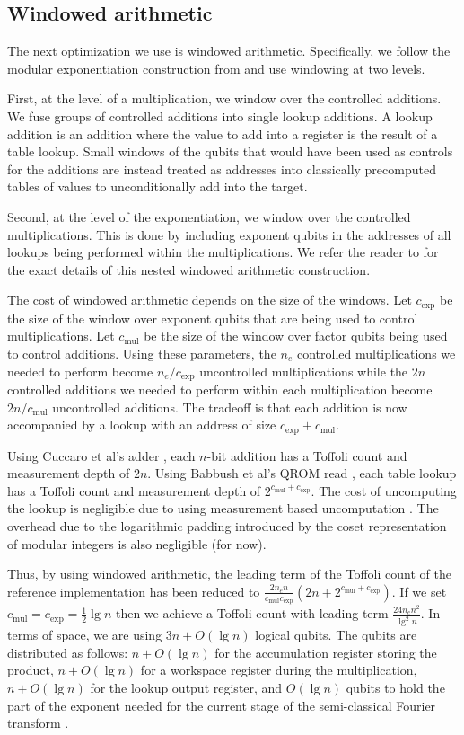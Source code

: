 \documentclass[superscriptaddress,notitlepage,longbibliography]{revtex4-1}
\theoremstyle{definition}
\theoremstyle{definition}
\newcommand{\lenexp}{{n_e}}
\newcommand{\gexp}{{c_{\text{exp}}}}
\newcommand{\gmul}{{c_{\text{mul}}}}
\begin{document}
\subsection{Windowed arithmetic}

The next optimization we use is windowed arithmetic.
Specifically, we follow the modular exponentiation construction from \cite{gidney2019windowedarithmetic} and use windowing at two levels.

First, at the level of a multiplication, we window over the controlled additions.
We fuse groups of controlled additions into single lookup additions.
A lookup addition is an addition where the value to add into a register is the result of a table lookup.
Small windows of the qubits that would have been used as controls for the additions are instead treated as addresses into classically precomputed tables of values to unconditionally add into the target.

Second, at the level of the exponentiation, we window over the controlled multiplications.
This is done by including exponent qubits in the addresses of all lookups being performed within the multiplications.
We refer the reader to \cite{gidney2019windowedarithmetic} for the exact details of this nested windowed arithmetic construction.

The cost of windowed arithmetic depends on the size of the windows.
Let $\gexp$ be the size of the window over exponent qubits that are being used to control multiplications.
Let $\gmul$ be the size of the window over factor qubits being used to control additions.
Using these parameters, the $\lenexp$ controlled multiplications we needed to perform become $\lenexp / \gexp$ uncontrolled multiplications while the $2 n$ controlled additions we needed to perform within each multiplication become $2 n / \gmul$ uncontrolled additions.
The tradeoff is that each addition is now accompanied by a lookup with an address of size $\gexp + \gmul$.

Using Cuccaro et al's adder \cite{cuccaro2004adder}, each $n$-bit addition has a Toffoli count and measurement depth of $2n$.
Using Babbush et al's QROM read \cite{babbush2018}, each table lookup has a Toffoli count and measurement depth of $2^{\gmul+\gexp}$.
The cost of uncomputing the lookup is negligible due to using measurement based uncomputation \cite{berry2019qubitization}.
The overhead due to the logarithmic padding introduced by the coset representation of modular integers is also negligible (for now).

Thus, by using windowed arithmetic, the leading term of the Toffoli count of the reference implementation has been reduced to $\frac{2 \lenexp n}{\gmul \gexp} (2n + 2^{\gmul + \gexp})$.
If we set $\gmul = \gexp = \frac{1}{2} \lg n$ then we achieve a Toffoli count with leading term $\frac{24 \lenexp n^2}{\lg^2 n}$.
In terms of space, we are using $3n + O(\lg n)$ logical qubits.
The qubits are distributed as follows:
  $n+O(\lg n)$ for the accumulation register storing the product,
  $n+O(\lg n)$ for a workspace register during the multiplication,
  $n + O(\lg n)$ for the lookup output register,
  and $O(\lg n)$ qubits to hold the part of the exponent needed for the current stage of the semi-classical Fourier transform \cite{griffiths1996semiclassical}.
\end{document}
